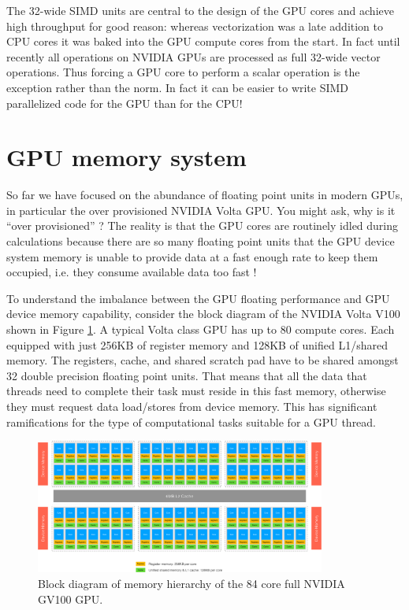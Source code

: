 The 32-wide SIMD units are central to the design of the GPU cores and achieve high throughput for good reason: whereas vectorization was a late addition to CPU cores it was baked into the GPU compute cores from the start. In fact until recently all operations on NVIDIA GPUs are processed as full 32-wide vector operations. Thus forcing a GPU core to perform a scalar operation is the exception rather than the norm. In fact it can be easier to write SIMD parallelized code for the GPU than for the CPU!

\section{GPU memory system}


So far we have focused on the abundance of floating point units in modern GPUs, in particular the over provisioned NVIDIA Volta GPU. You might ask, why is it ``over provisioned'' ? The reality is that the GPU cores are routinely idled during calculations because there are so many floating point units that the GPU device system memory is unable to provide data at a fast enough rate to keep them occupied, i.e. they consume available data too fast !

To understand the imbalance between the GPU floating performance and GPU device memory capability, consider the block diagram of the NVIDIA Volta V100 shown in Figure \ref{GPUVoltaBlockMemoryDiagram.fig}. A typical Volta class GPU has up to 80 compute cores. Each equipped with just 256KB of register memory and 128KB of unified L1/shared memory. The registers, cache, and shared scratch pad have to be shared amongst 32 double precision floating point units. That means that all the data that threads need to complete their task must reside in this fast memory, otherwise they must request data load/stores from device memory. This has significant ramifications for the type of computational tasks suitable for a GPU thread. 

\begin{figure}[htbp!]
    \centering
    \includegraphics[width=0.85\textwidth]{figures/L24/CMDA3634FA19VoltaBlockMemory-crop.pdf}
    \caption{Block diagram of memory hierarchy of the 84 core full NVIDIA GV100 GPU.}
    \label{GPUVoltaBlockMemoryDiagram.fig}
\end{figure}


